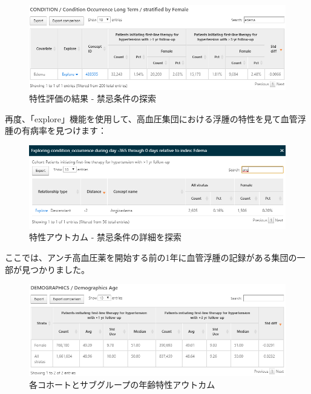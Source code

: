 \documentclass[
  11pt]{book}
\theoremstyle{definition}
\theoremstyle{definition}
\theoremstyle{definition}
\theoremstyle{definition}
\theoremstyle{remark}
\begin{document}
\begin{figure}

{\centering \includegraphics[width=1\linewidth]{images/Characterization/atlasCharacterizationResultsContra} 

}

\caption{特性評価の結果 - 禁忌条件の探索}\label{fig:atlasCharacterizationResultsContra}
\end{figure}

再度、「explore」機能を使用して、高血圧集団における浮腫の特性を見て血管浮腫の有病率を見つけます：

\begin{figure}

{\centering \includegraphics[width=1\linewidth]{images/Characterization/atlasCharacterizationResultsContraExplore} 

}

\caption{特性アウトカム - 禁忌条件の詳細を探索}\label{fig:atlasCharacterizationResultsContraExplore}
\end{figure}

ここでは、アンチ高血圧薬を開始する前の1年に血管浮腫の記録がある集団の一部が見つかりました。

\begin{figure}

{\centering \includegraphics[width=1\linewidth]{images/Characterization/atlasCharacterizationResultsContinuous} 

}

\caption{各コホートとサブグループの年齢特性アウトカム}\label{fig:atlasCharacterizationResultsContinuous}
\end{figure}
\end{document}
